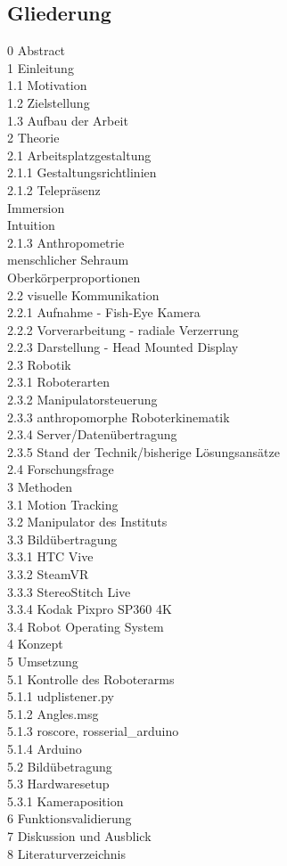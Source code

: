 \subsection{Gliederung}
0 Abstract\\
1 Einleitung\\
  1.1 Motivation\\
  1.2 Zielstellung\\
  1.3 Aufbau der Arbeit\\
2 Theorie\\
  2.1 Arbeitsplatzgestaltung\\
    2.1.1 Gestaltungsrichtlinien\\
    2.1.2 Telepräsenz\\
      Immersion\\
      Intuition\\
    2.1.3 Anthropometrie\\
      menschlicher Sehraum\\
      Oberkörperproportionen\\
  2.2 visuelle Kommunikation\\
    2.2.1 Aufnahme - Fish-Eye Kamera\\
    2.2.2 Vorverarbeitung - radiale Verzerrung\\
    2.2.3 Darstellung - Head Mounted Display\\
  2.3 Robotik\\
    2.3.1 Roboterarten\\
    2.3.2 Manipulatorsteuerung\\
    2.3.3 anthropomorphe Roboterkinematik\\
    2.3.4 Server/Datenübertragung\\
    2.3.5 Stand der Technik/bisherige Lösungsansätze\\
  2.4 Forschungsfrage\\
3 Methoden\\
  3.1 Motion Tracking\\
  3.2 Manipulator des Instituts\\
  3.3 Bildübertragung\\
    3.3.1 HTC Vive\\
    3.3.2 SteamVR\\
    3.3.3 StereoStitch Live\\
    3.3.4 Kodak Pixpro SP360 4K\\
  3.4 Robot Operating System\\
4 Konzept\\
5 Umsetzung\\
  5.1 Kontrolle des Roboterarms\\
    5.1.1 udplistener.py\\
    5.1.2 Angles.msg\\
    5.1.3 roscore, rosserial\_arduino\\
    5.1.4 Arduino\\
  5.2 Bildübetragung\\
  5.3 Hardwaresetup\\
    5.3.1 Kameraposition\\
6 Funktionsvalidierung\\
7 Diskussion und Ausblick\\
8 Literaturverzeichnis
